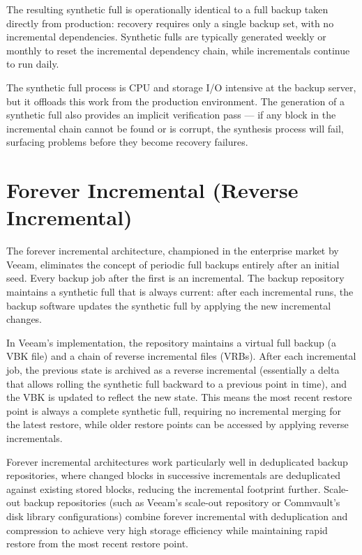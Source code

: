 The resulting synthetic full is operationally identical to a full backup taken directly from production: recovery requires only a single backup set, with no incremental dependencies. Synthetic fulls are typically generated weekly or monthly to reset the incremental dependency chain, while incrementals continue to run daily.

The synthetic full process is CPU and storage I/O intensive at the backup server, but it offloads this work from the production environment. The generation of a synthetic full also provides an implicit verification pass --- if any block in the incremental chain cannot be found or is corrupt, the synthesis process will fail, surfacing problems before they become recovery failures.

\section{Forever Incremental (Reverse Incremental)}
The forever incremental architecture, championed in the enterprise market by Veeam, eliminates the concept of periodic full backups entirely after an initial seed. Every backup job after the first is an incremental. The backup repository maintains a synthetic full that is always current: after each incremental runs, the backup software updates the synthetic full by applying the new incremental changes.

In Veeam's implementation, the repository maintains a virtual full backup (a VBK file) and a chain of reverse incremental files (VRBs). After each incremental job, the previous state is archived as a reverse incremental (essentially a delta that allows rolling the synthetic full backward to a previous point in time), and the VBK is updated to reflect the new state. This means the most recent restore point is always a complete synthetic full, requiring no incremental merging for the latest restore, while older restore points can be accessed by applying reverse incrementals.

Forever incremental architectures work particularly well in deduplicated backup repositories, where changed blocks in successive incrementals are deduplicated against existing stored blocks, reducing the incremental footprint further. Scale-out backup repositories (such as Veeam's scale-out repository or Commvault's disk library configurations) combine forever incremental with deduplication and compression to achieve very high storage efficiency while maintaining rapid restore from the most recent restore point.


